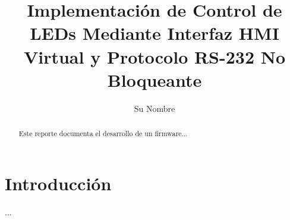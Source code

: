 \documentclass[journal]{IEEEtran}
\begin{document}
\newpage
{} %

\title{Implementación de Control de LEDs Mediante Interfaz HMI Virtual y Protocolo RS-232 No Bloqueante}
\author{Su Nombre}
\maketitle

\begin{abstract}
Este reporte documenta el desarrollo de un firmware...
\end{abstract}

\section{Introducción}
...
\end{document}
